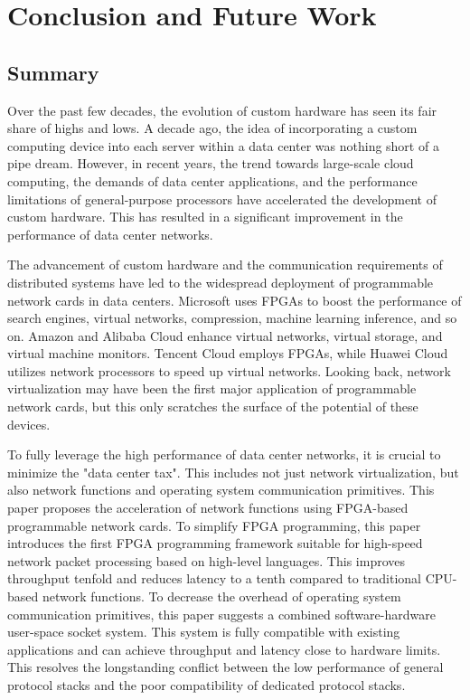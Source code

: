 \chapter{Conclusion and Future Work}

\section{Summary}

Over the past few decades, the evolution of custom hardware has seen its fair share of highs and lows. A decade ago, the idea of incorporating a custom computing device into each server within a data center was nothing short of a pipe dream. However, in recent years, the trend towards large-scale cloud computing, the demands of data center applications, and the performance limitations of general-purpose processors have accelerated the development of custom hardware. This has resulted in a significant improvement in the performance of data center networks.

The advancement of custom hardware and the communication requirements of distributed systems have led to the widespread deployment of programmable network cards in data centers. Microsoft uses FPGAs to boost the performance of search engines, virtual networks, compression, machine learning inference, and so on. Amazon and Alibaba Cloud enhance virtual networks, virtual storage, and virtual machine monitors. Tencent Cloud employs FPGAs, while Huawei Cloud utilizes network processors to speed up virtual networks. Looking back, network virtualization may have been the first major application of programmable network cards, but this only scratches the surface of the potential of these devices.

To fully leverage the high performance of data center networks, it is crucial to minimize the "data center tax". This includes not just network virtualization, but also network functions and operating system communication primitives. This paper proposes the acceleration of network functions using FPGA-based programmable network cards. To simplify FPGA programming, this paper introduces the first FPGA programming framework suitable for high-speed network packet processing based on high-level languages. This improves throughput tenfold and reduces latency to a tenth compared to traditional CPU-based network functions. To decrease the overhead of operating system communication primitives, this paper suggests a combined software-hardware user-space socket system. This system is fully compatible with existing applications and can achieve throughput and latency close to hardware limits. This resolves the longstanding conflict between the low performance of general protocol stacks and the poor compatibility of dedicated protocol stacks.

